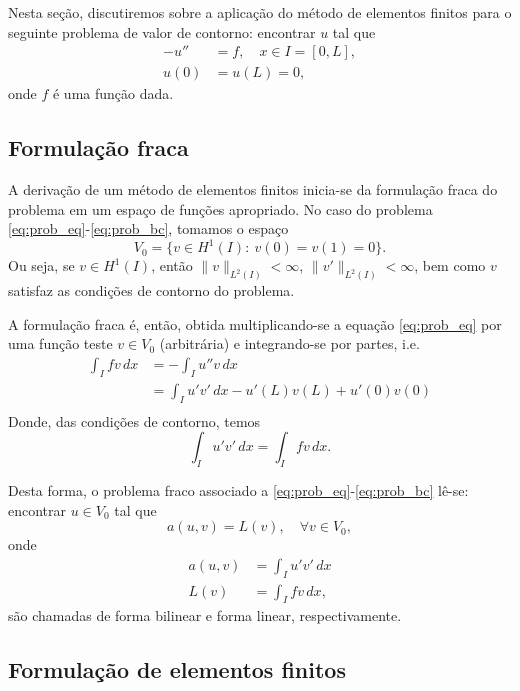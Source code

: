 Nesta seção, discutiremos sobre a aplicação do método de elementos finitos para o seguinte problema de valor de contorno: encontrar $u$ tal que
\begin{align}
  -u'' &= f,\quad x\in I=[0,L],\label{eq:prob_eq}\\
  u(0) &= u(L) = 0,\label{eq:prob_bc}
\end{align}
onde $f$ é uma função dada.

\subsection{Formulação fraca}

A derivação de um método de elementos finitos inicia-se da formulação fraca do problema em um espaço de funções apropriado. No caso do problema \eqref{eq:prob_eq}-\eqref{eq:prob_bc}, tomamos o espaço
\begin{equation}
  V_0 = \{v\in H^1(I):~v(0)=v(1)=0\}.
\end{equation}
Ou seja, se $v\in H^1(I)$, então $\|v\|_{L^2(I)}<\infty$, $\|v'\|_{L^2(I)}<\infty$, bem como $v$ satisfaz as condições de contorno do problema.

A formulação fraca é, então, obtida multiplicando-se a equação \eqref{eq:prob_eq} por uma função teste $v\in V_0$ (arbitrária) e integrando-se por partes, i.e.
\begin{align}
  \int_I fv\,dx &= -\int_I u''v\,dx\\
  &= \int_I u'v'\,dx - u'(L)v(L) + u'(0)v(0)\\
\end{align}
Donde, das condições de contorno, temos
\begin{equation}
  \int_I u'v'\,dx = \int_I fv\,dx.
\end{equation}

Desta forma, o problema fraco associado a \eqref{eq:prob_eq}-\eqref{eq:prob_bc} lê-se: encontrar $u\in V_0$ tal que
\begin{equation}\label{eq:modelo_ffraca}
  a(u,v) = L(v),\quad\forall v\in V_0,
\end{equation}
onde
\begin{align}
  a(u,v) &= \int_I u'v'\,dx\label{eq:modelo_fbilinear}\\
  L(v) &= \int_I fv\,dx,\label{eq:modelo_flinear}
\end{align}
são chamadas de forma bilinear e forma linear, respectivamente.

\subsection{Formulação de elementos finitos}

